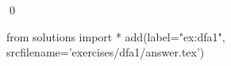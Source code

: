 
\begin{ex} 
  \label{ex:dfa1}
  
  \qed
\end{ex} 
\begin{python0}
from solutions import *
add(label="ex:dfa1",
    srcfilename='exercises/dfa1/answer.tex') 
\end{python0}
